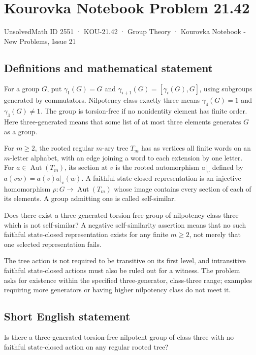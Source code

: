 \documentclass[11pt,a4paper]{article}
\begin{document}
\section*{Kourovka Notebook Problem 21.42}\label{2551}
{\small UnsolvedMath ID 2551 · KOU-21.42 · Group Theory · Kourovka Notebook - New Problems, Issue 21}
\subsection{Definitions and mathematical statement}
For a group $G$, put $\gamma_1(G)=G$ and
$\gamma_{i+1}(G)=[\gamma_i(G),G]$, using subgroups generated by
commutators. Nilpotency class exactly three means
$\gamma_4(G)=1$ and $\gamma_3(G)\ne1$.
The group is torsion-free if no nonidentity element has finite order.
Here three-generated means that some list of at most three elements
generates $G$ as a group.

For $m\ge2$, the rooted regular $m$-ary tree $T_m$ has as vertices
all finite words on an $m$-letter alphabet, with an edge joining a word
to each extension by one letter. For $a\in\operatorname{Aut}(T_m)$,
its section at $v$ is the rooted automorphism $a|_v$ defined by
$a(vw)=a(v)a|_v(w)$.
A faithful state-closed representation is an injective homomorphism
$\rho:G\to\operatorname{Aut}(T_m)$ whose image contains every section
of each of its elements. A group admitting one is called self-similar.

Does there exist a three-generated torsion-free group of nilpotency
class three which is not self-similar? A negative self-similarity
assertion means that no such faithful state-closed representation exists
for any finite $m\ge2$, not merely that one selected representation fails.

The tree action is not required to be transitive on its first level,
and intransitive faithful state-closed actions must also be ruled out
for a witness. The problem asks for existence within the specified
three-generator, class-three range; examples requiring more generators
or having higher nilpotency class do not meet it.
\subsection{Short English statement}
Is there a three-generated torsion-free nilpotent group of class three with no faithful state-closed action on any regular rooted tree?
\end{document}
